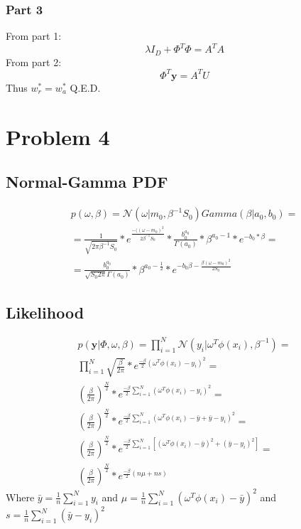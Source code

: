 \documentclass{article}
\begin{document}
\subsubsection{Part 3}
From part 1:
\begin{equation}
    \lambda I_D + \Phi^T\Phi = A^TA    
\end{equation}
From part 2: 
\begin{equation}
    \Phi^T\mathbf{y} = A^TU
\end{equation}
Thus $w_r^*=w_a^*$ Q.E.D.
\section{Problem 4}
\subsection{Normal-Gamma PDF}
\begin{multline}
    p(\omega, \beta) = \mathcal{N}(\omega|m_0, \beta^{-1}S_0)Gamma(\beta|a_0,b_0) =\\=
    \frac{1}{\sqrt{2\pi \beta^{-1}S_0}} * e ^ {\frac{-((\omega - m_0)^2}{2\beta^{-1}S_0}} *
    \frac{b_0^{a_0}}{\Gamma(a_0)} * \beta^{a_0 - 1} * e^{-b_0 * \beta} =\\
    = \frac{b_0^{a_0}}{\sqrt{S_0 2\pi} \Gamma(a_0)} * \beta^{a_0 - \frac{1}{2}} * e ^{-b_0\beta - \frac{\beta(\omega-m_0)^2}{2S_0}}
\end{multline}
\subsection{Likelihood}
\begin{multline}
    p(\mathbf{y} | \Phi, \omega, \beta) =  
    \prod_{i=1}^N\mathcal{N}(y_i|\omega^T\phi(x_i),\beta^{-1}) = \\ 
    \prod_{i=1}^N \sqrt{\frac{\beta}{2\pi}} * e^{\frac{-\beta}{2} (\omega^T\phi(x_i) - y_i)^2} = \\
    (\frac{\beta}{2\pi})^{\frac{N}{2}} * e^{\frac{-\beta}{2} \sum_{i=1}^N(\omega^T\phi(x_i) - y_i)^2} =\\
    (\frac{\beta}{2\pi})^{\frac{N}{2}} * e^{\frac{-\beta}{2} \sum_{i=1}^N(\omega^T\phi(x_i) - \bar{y} + \bar{y} - y_i)^2} = \\ 
    (\frac{\beta}{2\pi})^{\frac{N}{2}} * e^{\frac{-\beta}{2} \sum_{i=1}^N[(\omega^T\phi(x_i) - \bar{y})^2 + (\bar{y} - y_i)^2]} =\\
    (\frac{\beta}{2\pi})^{\frac{N}{2}} * e^{\frac{-\beta}{2} (n\mu + ns)}
\end{multline}
Where $\bar{y} = \frac{1}{n} \sum_{i=1}^N y_i$ and $\mu = \frac{1}{n}\sum_{i=1}^N(\omega^T\phi(x_i) - \bar{y})^2$ and 
$s = \frac{1}{n}\sum_{i=1}^N(\bar{y} - y_i)^2$  
\end{document}
